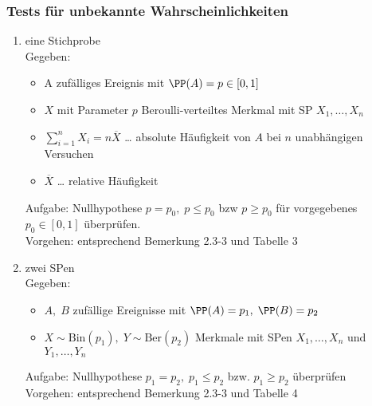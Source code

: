 \documentclass{scrreprt}
\begin{document}
\subsubsection{Tests für unbekannte Wahrscheinlichkeiten}
\begin{enumerate}[label=(\Alph*)]
\item eine Stichprobe\\
Gegeben:
\begin{itemize}
\item A zufälliges Ereignis mit $\PP(A)=p\in[0,1]$
\item $X$ mit Parameter $p$ Beroulli-verteiltes Merkmal mit SP $X_1, \ldots, X_n$
\item $\sum_{i=1}^n X_i = n \overline{X}$ … absolute Häufigkeit von $A$ bei $n$ unabhängigen Versuchen
\item $\overline{X}$ … relative Häufigkeit
\end{itemize}
Aufgabe: Nullhypothese $p=p_0, \; p \leq p_0$ bzw $p \geq p_0$ für vorgegebenes $p_0\in [0,1]$ überprüfen.\\
Vorgehen: entsprechend Bemerkung 2.3-3 und Tabelle 3
\item zwei SPen\\
Gegeben:
\begin{itemize}
\item $A,\;B$ zufällige Ereignisse mit $\PP(A)=p_1, \; \PP(B)=p_2$
\item $X\sim \mathrm{Bin}(p_1), \; Y\sim \mathrm{Ber}(p_2)$ Merkmale mit SPen $X_1, \ldots, X_n$ und $Y_1, \ldots , Y_n$
\end{itemize}
Aufgabe: Nullhypothese $p_1=p_2,\; p_1 \leq p_2$ bzw. $p_1 \geq p_2$ überprüfen\\
Vorgehen: entsprechend Bemerkung 2.3-3 und Tabelle 4
\end{enumerate}
\end{document}
